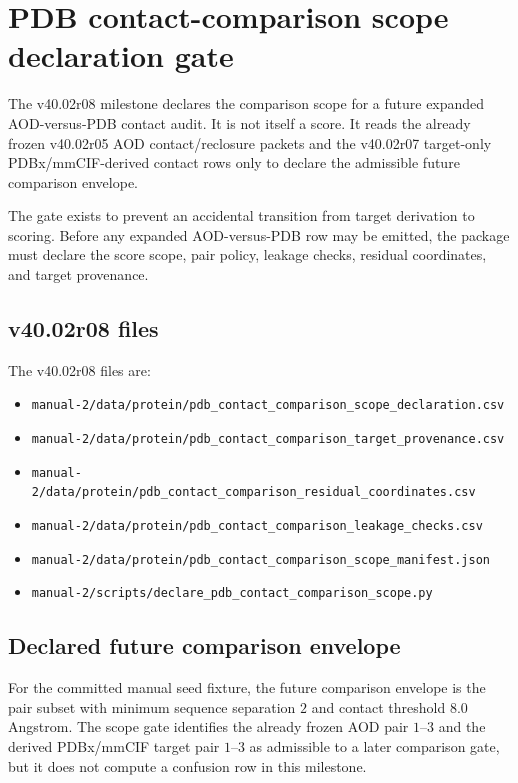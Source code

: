 \section{PDB contact-comparison scope declaration gate}

The v40.02r08 milestone declares the comparison scope for a future expanded AOD-versus-PDB contact audit. It is not itself a score. It reads the already frozen v40.02r05 AOD contact/reclosure packets and the v40.02r07 target-only PDBx/mmCIF-derived contact rows only to declare the admissible future comparison envelope.

The gate exists to prevent an accidental transition from target derivation to scoring. Before any expanded AOD-versus-PDB row may be emitted, the package must declare the score scope, pair policy, leakage checks, residual coordinates, and target provenance.

\subsection{v40.02r08 files}

The v40.02r08 files are:

\begin{itemize}
\item \texttt{manual-2/data/protein/pdb\_contact\_comparison\_scope\_declaration.csv}
\item \texttt{manual-2/data/protein/pdb\_contact\_comparison\_target\_provenance.csv}
\item \texttt{manual-2/data/protein/pdb\_contact\_comparison\_residual\_coordinates.csv}
\item \texttt{manual-2/data/protein/pdb\_contact\_comparison\_leakage\_checks.csv}
\item \texttt{manual-2/data/protein/pdb\_contact\_comparison\_scope\_manifest.json}
\item \texttt{manual-2/scripts/declare\_pdb\_contact\_comparison\_scope.py}
\end{itemize}

\subsection{Declared future comparison envelope}

For the committed manual seed fixture, the future comparison envelope is the pair subset with minimum sequence separation $2$ and contact threshold $8.0$ Angstrom. The scope gate identifies the already frozen AOD pair $1$--$3$ and the derived PDBx/mmCIF target pair $1$--$3$ as admissible to a later comparison gate, but it does not compute a confusion row in this milestone.

